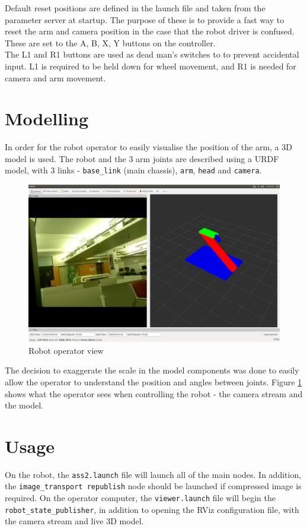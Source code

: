 \documentclass[titlepage,12pt,a4paper]{article}
\begin{document}
\noindent Default reset positions are defined in the launch file and taken from the parameter server at startup. The purpose of these is to provide a fast way to reset the arm and camera position in the case that the robot driver is confused. These are set to the A, B, X, Y buttons on the controller. \\

\noindent The L1 and R1 buttons are used as dead man's switches to to prevent accidental input. L1 is required to be held down for wheel movement, and R1 is needed for camera and arm movement.\\

\newpage
\section{Modelling}
In order for the robot operator to easily visualise the position of the arm, a 3D model is used. The robot and the 3 arm joints are described using a URDF model, with 3 links - \texttt{base\_link} (main chassis), \texttt{arm}, \texttt{head} and \texttt{camera}.\\


\begin{figure}
  \centering
    \includegraphics[width=\textwidth]{rviz}
  \caption{Robot operator view}
  \label{fig:rviz}
\end{figure}

\noindent The decision to exaggerate the scale in the model components was done to easily allow the operator to understand the position and angles between joints. Figure \ref{fig:rviz} shows what the operator sees when controlling the robot - the camera stream and the model.

\section{Usage}
On the robot, the \texttt{ass2.launch} file will launch all of the main nodes. In addition, the \texttt{image\_transport republish} node should be launched if compressed image is required. On the operator computer, the \texttt{viewer.launch} file will begin the \texttt{robot\_state\_publisher}, in addition to opening the RViz configuration file, with the camera stream and live 3D model.
\end{document}
